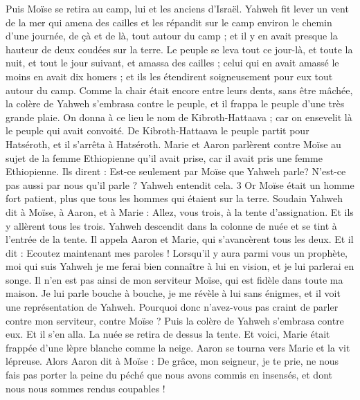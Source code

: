 \begin{multicols}{2}
Puis Moïse se retira au camp, lui et les anciens d'Israël.
Yahweh fit lever un vent de la mer qui amena des cailles et les répandit sur le camp environ le chemin d'une journée, de çà et de là, tout autour du camp ; et il y en avait presque la hauteur de deux coudées sur la terre.
Le peuple se leva tout ce jour-là, et toute la nuit, et tout le jour suivant, et amassa des cailles ; celui qui en avait amassé le moins en avait dix homers ; et ils les étendirent soigneusement pour eux tout autour du camp.
Comme la chair était encore entre leurs dents, sans être mâchée, la colère de Yahweh s'embrasa contre le peuple, et il frappa le peuple d'une très grande plaie.
On donna à ce lieu le nom de Kibroth-Hattaava ; car on ensevelit là le peuple qui avait convoité.
De Kibroth-Hattaava le peuple partit pour Hatséroth, et il s'arrêta à Hatséroth.
\VerseOne{}Marie et Aaron parlèrent contre Moïse au sujet de la femme Ethiopienne qu'il avait prise, car il avait pris une femme Ethiopienne.
Ils dirent : Est-ce seulement par Moïse que Yahweh parle? N’est-ce pas aussi par nous qu’il parle ? Yahweh entendit cela. 3 Or Moïse était un homme fort patient, plus que tous les hommes qui étaient sur la terre.
Soudain Yahweh dit à Moïse, à Aaron, et à Marie : Allez, vous trois, à la tente d'assignation. Et ils y allèrent tous les trois.
Yahweh descendit dans la colonne de nuée et se tint à l'entrée de la tente. Il appela Aaron et Marie, qui s’avancèrent tous les deux.
Et il dit : Ecoutez maintenant mes paroles ! Lorsqu’il y aura parmi vous un prophète, moi qui suis Yahweh je me ferai bien connaître à lui en vision, et je lui parlerai en songe.
Il n'en est pas ainsi de mon serviteur Moïse, qui est fidèle dans toute ma maison.
Je lui parle bouche à bouche, je me révèle à lui sans énigmes, et il voit une représentation de Yahweh. Pourquoi donc n’avez-vous pas craint de parler contre mon serviteur, contre Moïse ?
Puis la colère de Yahweh s'embrasa contre eux. Et il s'en alla.
La nuée se retira de dessus la tente. Et voici, Marie était frappée d’une lèpre blanche comme la neige. Aaron se tourna vers Marie et la vit lépreuse.
Alors Aaron dit à Moïse : De grâce, mon seigneur, je te prie, ne nous fais pas porter la peine du péché que nous avons commis en insensés, et dont nous nous sommes rendus coupables !

\end{multicols}
